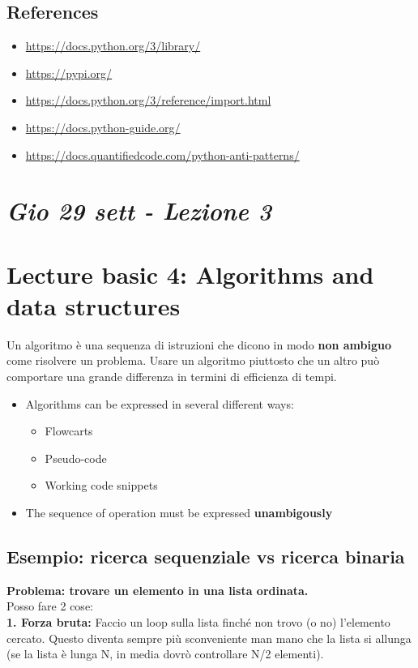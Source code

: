 \subsection{References}
\begin{itemize}
  \item \url{https://docs.python.org/3/library/}
  \item \url{https://pypi.org/}
  \item \url{https://docs.python.org/3/reference/import.html}
  \item \url{https://docs.python-guide.org/}
  \item \url{https://docs.quantifiedcode.com/python-anti-patterns/}
  \end{itemize}

\newpage
\section{\textit{Gio 29 sett - Lezione 3}}
\section{Lecture basic 4: Algorithms and data structures}

Un algoritmo è una sequenza di istruzioni che dicono in modo \textbf{non ambiguo} come risolvere un problema.
Usare un algoritmo piuttosto che un altro può comportare una grande differenza in termini di efficienza di tempi.
\begin{itemize}
  \item Algorithms can be expressed in several different ways:
    \begin{itemize}
    \item Flowcarts
    \item Pseudo-code
    \item Working code snippets
    \end{itemize}
  \item The sequence of operation must be expressed \textbf{unambigously}
  \end{itemize}

\subsection{Esempio: ricerca sequenziale vs ricerca binaria}
\textbf{Problema: trovare un elemento in una lista ordinata.}\\
Posso fare 2 cose:\\
\textbf{1. Forza bruta:} Faccio un loop sulla lista finché non trovo (o no) l'elemento cercato. Questo diventa sempre più sconveniente man mano che la lista si allunga (se la lista è lunga N, in media dovrò controllare N/2 elementi).\\

